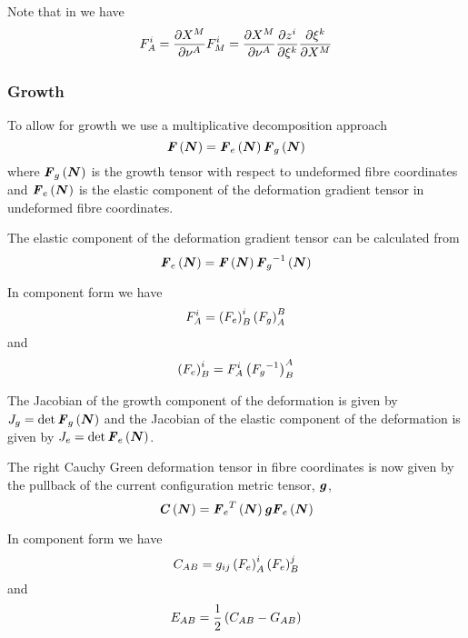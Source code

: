 Note that in \OpenCMISS we have
\begin{equation}
  F^{i}_{A}= \dfrac{\partial X^{M}}{\partial \nu^{A}} F^{i}_{M}= \dfrac{\partial X^{M}}{\partial \nu^{A}}  \dfrac{\partial z^{i}}{\partial \xi^{k}}  \dfrac{\partial \xi^{k}}{\partial X^{M}} 
\end{equation}

\subsubsection{Growth}

To allow for growth we use a multiplicative decomposition approach \ie
\begin{equation}
   \boldsymbol{\mathit{F}}\left( \boldsymbol{N} \right) = \boldsymbol{\mathit{F}}_{e}\left( \boldsymbol{N} \right)  \boldsymbol{\mathit{F}}_{g}\left( \boldsymbol{N} \right) 
\end{equation}
where $ \boldsymbol{\mathit{F}}_{g}\left( \boldsymbol{N} \right) $ is the growth tensor with
respect to undeformed fibre coordinates and $ \boldsymbol{\mathit{F}}_{e}\left( \boldsymbol{N} \right) $ is the
elastic component of the deformation gradient tensor in undeformed fibre coordinates.

The elastic component of the deformation gradient tensor can be calculated
from
\begin{equation}
   \boldsymbol{\mathit{F}}_{e}\left( \boldsymbol{N} \right) = \boldsymbol{\mathit{F}}\left( \boldsymbol{N} \right)  {\boldsymbol{\mathit{F}}_{g}}^{-1}\left( \boldsymbol{N} \right) 
\end{equation}

In component form we have
\begin{equation}
  F^{i}_{A}=\left( F_{e} \right)^{i}_{B}\left( F_{g} \right)^{B}_{A}
\end{equation}
and
\begin{equation}
  \left( F_{e} \right)^{i}_{B}=F^{i}_{A}\left( {F_{g}}^{-1} \right)^{A}_{B}
\end{equation}

The Jacobian of the growth component of the deformation is given by
$J_{g}=\det{\ensuremath{ \boldsymbol{\mathit{F}}_{g}\left( \boldsymbol{N} \right) }}$ and the Jacobian of the
elastic component of the deformation is given by
$J_{e}=\det{\ensuremath{ \boldsymbol{\mathit{F}}_{e}\left( \boldsymbol{N} \right) }}$.

The right Cauchy Green deformation tensor in fibre coordinates is now given by
the pullback of the current configuration metric tensor, $\boldsymbol{\mathit{g}}$,
\begin{equation}
   \boldsymbol{\mathit{C}}\left( \boldsymbol{N} \right) = {\boldsymbol{\mathit{F}}_{e}}^{T}\left( \boldsymbol{N} \right) \boldsymbol{\mathit{g}} \boldsymbol{\mathit{F}}_{e}\left( \boldsymbol{N} \right) 
\end{equation}

In component form we have
\begin{equation}
  C_{AB}=g_{ij}\left( F_{e} \right)^{i}_{A}\left( F_{e} \right)^{j}_{B}
\end{equation}
and
\begin{equation}
  E_{AB}=\frac{1}{2}\left( C_{AB}-G_{AB} \right)
\end{equation}

